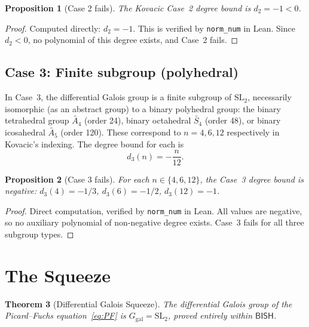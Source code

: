 \documentclass[11pt]{article}
\theoremstyle{plain}
\newtheorem{theorem}{Theorem}[section]
\newtheorem{proposition}[theorem]{Proposition}
\theoremstyle{definition}
\theoremstyle{remark}
\newcommand{\SL}{\mathrm{SL}}
\newcommand{\Ggal}{G_{\mathrm{gal}}}
\newcommand{\BISH}{\mathsf{BISH}}
\begin{document}
\begin{proposition}[Case 2 fails]\label{prop:case2}
The Kovacic Case~2 degree bound is $d_2 = -1 < 0$.
\end{proposition}

\begin{proof}
Computed directly: $d_2 = -1$.
This is verified by \texttt{norm\_num} in Lean.
Since $d_2 < 0$, no polynomial of this degree exists, and Case~2 fails.
\end{proof}

\subsection{Case 3: Finite subgroup (polyhedral)}

In Case~3, the differential Galois group is a finite subgroup of $\SL_2$, necessarily isomorphic (as an abstract group) to a binary polyhedral group: the binary tetrahedral group $\widetilde{A_4}$ (order 24), binary octahedral $\widetilde{S_4}$ (order 48), or binary icosahedral $\widetilde{A_5}$ (order 120).
These correspond to $n = 4, 6, 12$ respectively in Kovacic's indexing.
The degree bound for each is
\[
  d_3(n) = -\frac{n}{12}.
\]

\begin{proposition}[Case 3 fails]\label{prop:case3}
For each $n \in \{4, 6, 12\}$, the Case~3 degree bound is negative:
$d_3(4) = -1/3$, $d_3(6) = -1/2$, $d_3(12) = -1$.
\end{proposition}

\begin{proof}
Direct computation, verified by \texttt{norm\_num} in Lean.
All values are negative, so no auxiliary polynomial of non-negative degree exists.
Case~3 fails for all three subgroup types.
\end{proof}

\section{The Squeeze}
\label{sec:squeeze}

\begin{theorem}[Differential Galois Squeeze]\label{thm:squeeze}
The differential Galois group of the Picard--Fuchs equation~\eqref{eq:PF} is $\Ggal = \SL_2$, proved entirely within $\BISH$.
\end{theorem}
\end{document}
